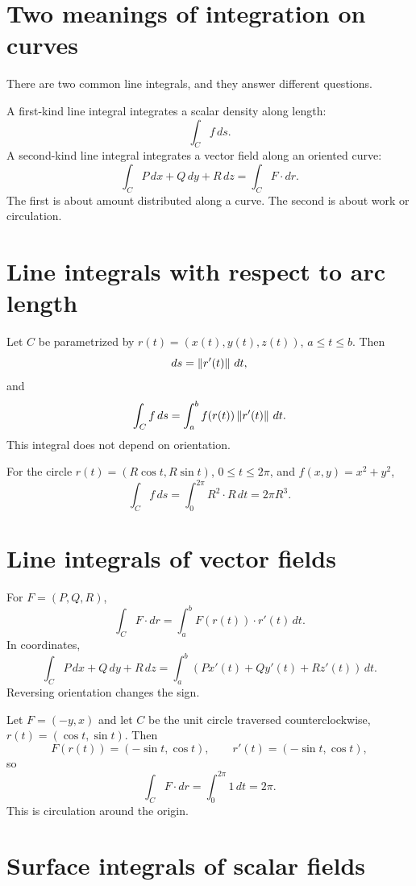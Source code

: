 
\section{Two meanings of integration on curves}

There are two common line integrals, and they answer different questions.

A first-kind line integral integrates a scalar density along length:
\[
  \int_C f\,ds.
\]
A second-kind line integral integrates a vector field along an oriented curve:
\[
  \int_C P\,dx+Q\,dy+R\,dz=\int_C F\cdot dr.
\]
The first is about amount distributed along a curve.  The second is about work or circulation.

\section{Line integrals with respect to arc length}

Let \(C\) be parametrized by \(r(t)=(x(t),y(t),z(t))\), \(a\le t\le b\).  Then
\[
  ds=\left\lVert r'(t) \right\rVert\,dt,
\]
and
\[
  \int_C f\,ds=\int_a^b f(r(t))\left\lVert r'(t) \right\rVert\,dt.
\]
This integral does not depend on orientation.

\begin{example}
For the circle \(r(t)=(R\cos t,R\sin t)\), \(0\le t\le2\pi\), and \(f(x,y)=x^2+y^2\),
\[
  \int_C f\,ds=\int_0^{2\pi}R^2\cdot R\,dt=2\pi R^3.
\]
\end{example}

\section{Line integrals of vector fields}

For \(F=(P,Q,R)\),
\[
  \int_C F\cdot dr
  =\int_a^b F(r(t))\cdot r'(t)\,dt.
\]
In coordinates,
\[
  \int_C P\,dx+Q\,dy+R\,dz
  =\int_a^b(Px'(t)+Qy'(t)+Rz'(t))\,dt.
\]
Reversing orientation changes the sign.

\begin{example}
Let \(F=(-y,x)\) and let \(C\) be the unit circle traversed counterclockwise, \(r(t)=(\cos t,\sin t)\).  Then
\[
  F(r(t))=(-\sin t,\cos t),\qquad r'(t)=(-\sin t,\cos t),
\]
so
\[
  \int_C F\cdot dr=\int_0^{2\pi}1\,dt=2\pi.
\]
This is circulation around the origin.
\end{example}

\section{Surface integrals of scalar fields}


